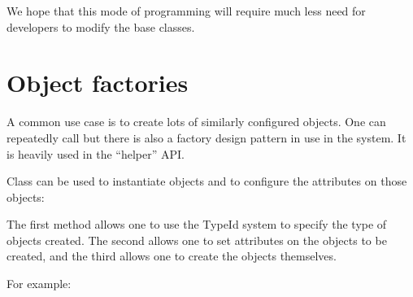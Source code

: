 \documentclass[letterpaper,10pt,english]{sphinxmanual}
\renewcommand{\sphinxcode}[1]{\texttt{\small{#1}}}
\begin{document}
We hope that this mode of programming will require much less need for developers
to modify the base classes.


\section{Object factories}
\label{\detokenize{object-model:object-factories}}
A common use case is to create lots of similarly configured objects. One can
repeatedly call \sphinxcode{} but there is also a factory design
pattern in use in the  system. It is heavily used in the “helper” API.

Class \sphinxcode{} can be used to instantiate objects and to
configure the attributes on those objects:

\begin{sphinxVerbatim}[commandchars=\\\{\}]
   
      
   
\end{sphinxVerbatim}

The first method allows one to use the  TypeId system to specify the type
of objects created. The second allows one to set attributes on the objects to be
created, and the third allows one to create the objects themselves.

For example:

\begin{sphinxVerbatim}[commandchars=\\\{\}]
 
 
   
    
   
    
\end{sphinxVerbatim}
\end{document}
